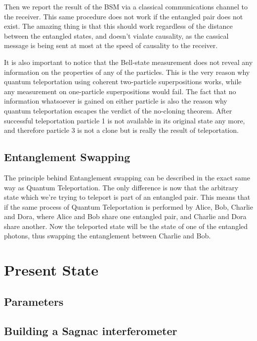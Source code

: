 \documentclass{article}
\theoremstyle{mytheoremstyle}
\theoremstyle{mytheoremstyle}
\theoremstyle{myproblemstyle}
\begin{document}
Then we report the result of the BSM via a classical communications channel to the receiver.
This same procedure does not work if the entangled pair does not exist.
The amazing thing is that this should work regardless of the distance between the entangled states,
and doesn't vialate causality, as the cassical message is being sent at most at the speed of causality to the receiver.

It is also important to notice that the Bell-state measurement does not reveal any information
on the properties of any of the particles. This is the very reason why
quantum teleportation using coherent two-particle superpositions works,
while any measurement on one-particle superpositions would fail.
The fact that no information whatsoever is gained on either particle is also the reason
why quantum teleportation escapes the verdict of the no-cloning theorem. After successful teleportation
particle 1 is not available in its original state any more,
and therefore particle 3 is not a clone but is really the result of teleportation.

\subsection{Entanglement Swapping}
The principle behind Entanglement swapping can be described in the exact same way as Quantum Teleportation. The only difference is now that the arbitrary
state which we're trying to teleport is part of an entangled pair. This means that if the same process of Quantum Teleportation is performed by Alice, Bob,
Charlie and Dora, where Alice and Bob share one entangled pair, and Charlie and Dora share another. Now the teleported state will be the state of
one of the entangled photons, thus swapping the entanglement between Charlie and Bob.

\section{Present State}
\subsection{Parameters}
\subsection{Building a Sagnac interferometer}



\end{document}
